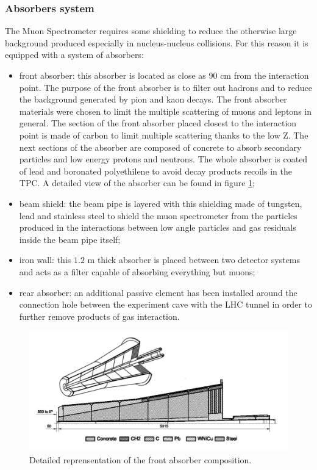 \subsubsection{Absorbers system}
The Muon Spectrometer requires some shielding to reduce the otherwise large background produced especially in nucleus-nucleus collisions.
For this reason it is equipped with a system of absorbers:
\begin{itemize}
    \item front absorber: this absorber is located as close as $90$ cm from the interaction point. The purpose of the front absorber is to filter out hadrons and to reduce the background generated by pion and kaon decays. The front absorber materials were chosen to limit the multiple scattering of muons and leptons in general. The section of the front absorber placed closest to the interaction point is made of carbon to limit multiple scattering thanks to the low Z. The next sections of the absorber are composed of concrete to absorb secondary particles and low energy protons and neutrons. The whole absorber is coated of lead and boronated polyethilene to avoid decay products recoils in the TPC. A detailed view of the absorber can be found in figure \ref{fig:absorber};
    \item beam shield: the beam pipe is layered with this shielding made of tungsten, lead and stainless steel to shield the muon spectrometer from the particles produced in the interactions between low angle particles and gas residuals inside the beam pipe itself;
    \item iron wall: this $1.2$ m thick absorber is placed between two detector systems and acts as a filter capable of absorbing everything but muons;
    \item rear absorber: an additional passive element has been installed around the connection hole between the experiment cave with the LHC tunnel in order to further remove products of gas interaction.
\end{itemize}

\begin{figure}[!h]
\begin{center}
\includegraphics[width=0.7\linewidth]{Chapters/Introduction/Figs/absorber.pdf}
\caption{Detailed reprensentation of the front absorber composition.}
\label{fig:absorber}
\end{center}
\end{figure}

